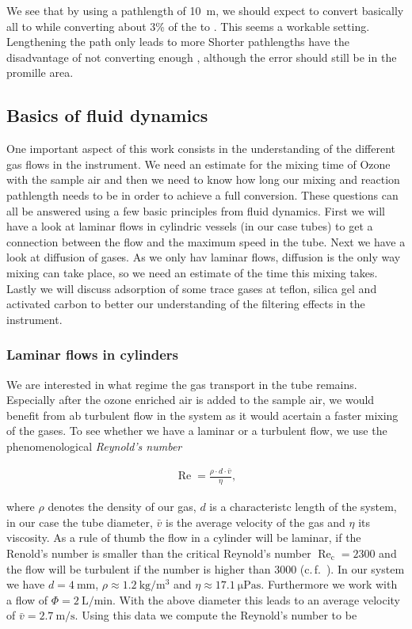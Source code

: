 We see that by using a pathlength of \SI{10}{\meter}, we should expect
to convert basically all  to  while converting about
3\% of the  to . This seems a workable
setting. Lengthening the path only leads to more  Shorter
pathlengths have the disadvantage of not converting enough ,
although the error should still be in the promille area.

\subsection{Basics of fluid dynamics}
\label{sec:fluid}

One important aspect of this work consists in the understanding of the
different gas flows in the instrument. We need an estimate for the
mixing time of Ozone with the sample air and then we need to know how
long our mixing and reaction pathlength needs to be in order to
achieve a full conversion. These questions can all be answered using a
few basic principles from fluid dynamics. First we will have a look at
laminar flows in cylindric vessels (in our case tubes) to get a
connection between the flow and the maximum speed in the tube. Next we
have a look at diffusion of gases. As we only hav laminar flows,
diffusion is the only way mixing can take place, so we need an
estimate of the time this mixing takes. Lastly we will discuss
adsorption of some trace gases at teflon, silica gel and activated
carbon to better our understanding of the filtering effects in the
instrument. 

\subsubsection{Laminar flows in cylinders}
\label{sec:cylinder}

We are interested in what regime the gas transport in the tube
remains. Especially after the ozone enriched air is added to the
sample air, we would benefit from ab turbulent flow in the system as
it would acertain a faster mixing of the gases. To see whether we have
a laminar or a turbulent flow, we use the phenomenological \emph{Reynold's
number}

\begin{align*}
  \operatorname{Re} = \frac{\rho \cdot d \cdot \bar v}{\eta},
\end{align*}

where $\rho$ denotes the density of our gas, $d$ is a characteristc
length of the system, in our case the tube diameter, $\bar v$ is the
average velocity of the gas and $\eta$ its viscosity. As a rule of
thumb the flow in a cylinder will be laminar, if the Renold's number
is smaller than the critical Reynold's number
$\operatorname{Re}_{\text{c}} = 2300$ and the flow will be turbulent
if the number is higher than $3000$ (c.\,f.~\cite{maschbau}). In our
system we have $d = \SI{4}{\milli\meter}$, $\rho \approx
\SI{1.2}{\kilo\gram\per\cubic\meter}$ and $\eta \approx
\SI{17.1}{\micro\pascal\second}$. Furthermore we work with a flow of
$\Phi = \SI{2}{\liter\per\minute}$. With the above diameter this
leads to an average velocity of $\bar v =
\SI{2.7}{\meter\per\second}$. Using this data we compute the Reynold's
number to be

